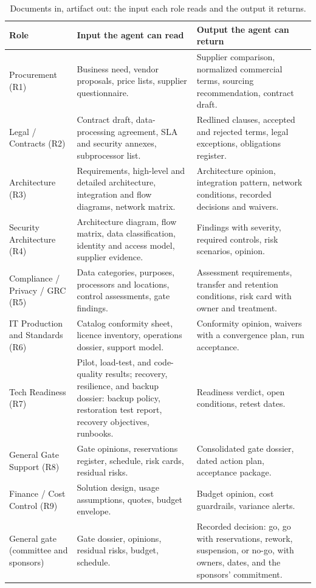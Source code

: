 \begin{table}[!htb]
\centering\small\renewcommand{\arraystretch}{1.18}
\caption{Documents in, artifact out: the input each role reads and the output it returns.}
\label{tab:roles}
\begin{tabularx}{\linewidth}{@{}P{3.3cm}LL@{}}
\toprule
Role & Input the agent can read & Output the agent can return\\
\midrule
Procurement (R1) & Business need, vendor proposals, price lists, supplier questionnaire. & Supplier
comparison, normalized commercial terms, sourcing recommendation, contract draft.\\
Legal / Contracts (R2) & Contract draft, data-processing agreement, SLA and security annexes,
subprocessor list. & Redlined clauses, accepted and rejected terms, legal exceptions, obligations
register.\\
Architecture (R3) & Requirements, high-level and detailed architecture, integration and flow diagrams,
network matrix. & Architecture opinion, integration pattern, network conditions, recorded decisions and
waivers.\\
Security Architecture (R4) & Architecture diagram, flow matrix, data classification, identity and
access model, supplier evidence. & Findings with severity, required controls, risk scenarios, opinion.\\
Compliance / Privacy / GRC (R5) & Data categories, purposes, processors and locations, control assessments, gate
findings. & Assessment requirements, transfer and retention conditions, risk card with owner and
treatment.\\
IT Production and Standards (R6) & Catalog conformity sheet, licence inventory, operations dossier,
support model. & Conformity opinion, waivers with a convergence plan, run
acceptance.\\
Tech Readiness (R7) & Pilot, load-test, and code-quality results; recovery, resilience, and backup
dossier: backup policy, restoration test report, recovery objectives, runbooks. & Readiness verdict,
open conditions, retest dates.\\
General Gate Support (R8) & Gate opinions, reservations register, schedule, risk cards, residual risks.
& Consolidated gate dossier, dated action plan, acceptance package.\\
Finance / Cost Control (R9) & Solution design, usage assumptions, quotes, budget envelope. & Budget
opinion, cost guardrails, variance alerts.\\
General gate (committee and sponsors) & Gate dossier, opinions, residual risks, budget, schedule. &
Recorded decision: go, go with reservations, rework, suspension, or no-go, with owners, dates, and the
sponsors' commitment.\\
\bottomrule
\end{tabularx}
\end{table}

